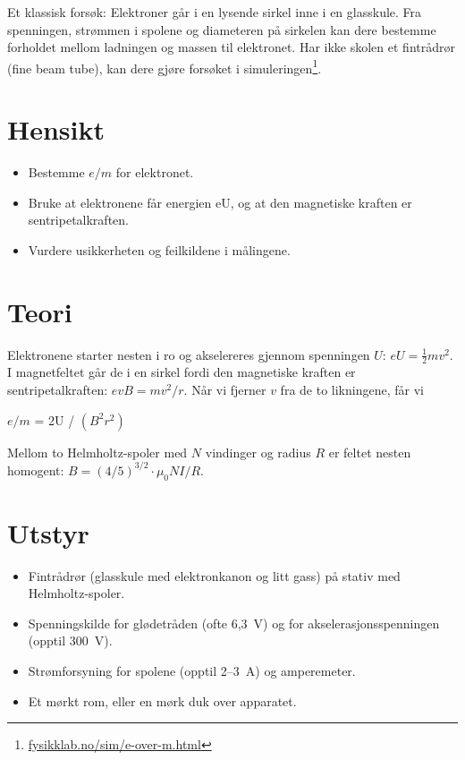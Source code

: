 \documentclass[11pt]{article}
\begin{document}

Et klassisk forsøk: Elektroner går i en lysende sirkel inne i en glasskule. Fra spenningen, strømmen i spolene og diameteren på sirkelen kan dere bestemme forholdet mellom ladningen og massen til elektronet. Har ikke skolen et fintrådrør (fine beam tube), kan dere gjøre forsøket i simuleringen\footnote{\url{fysikklab.no/sim/e-over-m.html}}.

\section*{Hensikt}

\begin{itemize}
\item Bestemme $e/m$ for elektronet.
\item Bruke at elektronene får energien eU, og at den magnetiske kraften er sentripetalkraften.
\item Vurdere usikkerheten og feilkildene i målingene.
\end{itemize}

\section*{Teori}

Elektronene starter nesten i ro og akselereres gjennom spenningen $U$: $eU = \tfrac{1}{2}mv^{2}$. I magnetfeltet går de i en sirkel fordi den magnetiske kraften er sentripetalkraften: $evB = mv^{2}/r$. Når vi fjerner $v$ fra de to likningene, får vi

$e/m$ = 2U / $(B^{2}r^{2})$

Mellom to Helmholtz-spoler med $N$ vindinger og radius $R$ er feltet nesten homogent: $B = (4/5)^{3/2} \cdot μ_{0}NI/R$.

\section*{Utstyr}

\begin{itemize}
\item Fintrådrør (glasskule med elektronkanon og litt gass) på stativ med Helmholtz-spoler.
\item Spenningskilde for glødetråden (ofte 6,3~V) og for akselerasjonsspenningen (opptil 300~V).
\item Strømforsyning for spolene (opptil 2–3~A) og amperemeter.
\item Et mørkt rom, eller en mørk duk over apparatet.
\end{itemize}
\end{document}
